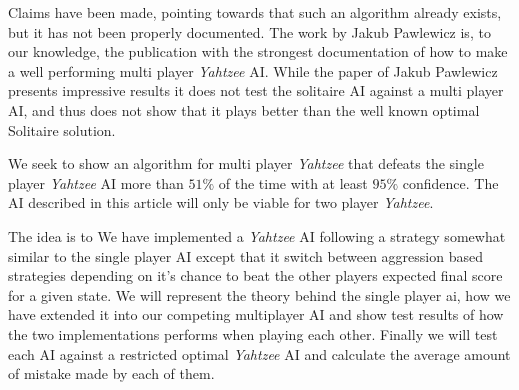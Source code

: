 Claims have been made, pointing towards that such an algorithm already exists, but it has not been properly documented.
The work by Jakub Pawlewicz is, to our knowledge, the publication with the strongest documentation of how to make a well performing multi player \emph{Yahtzee} AI.
While the paper of Jakub Pawlewicz\citep{pawlewicz2011nearly} presents impressive results it does not test the solitaire AI against a multi player AI, and thus does not show that it plays better than the well known optimal Solitaire solution.

We seek to show an algorithm for multi player \emph{Yahtzee} that defeats the single player \emph{Yahtzee} AI more than $51\%$ of the time with at least $95\%$ confidence.
The AI described in this article will only be viable for two player \emph{Yahtzee}.

The idea is to %
We have implemented a \emph{Yahtzee} AI following a strategy somewhat similar to the single player AI except that it switch between aggression based strategies depending on it's chance to beat the other players expected final score for a given state. 
We will represent the theory behind the single player ai, how we have extended it into our competing multiplayer AI and show test results of how the two implementations performs when playing each other. 
Finally we will test each AI against a restricted optimal \emph{Yahtzee} AI and calculate the average amount of mistake made by each of them.

